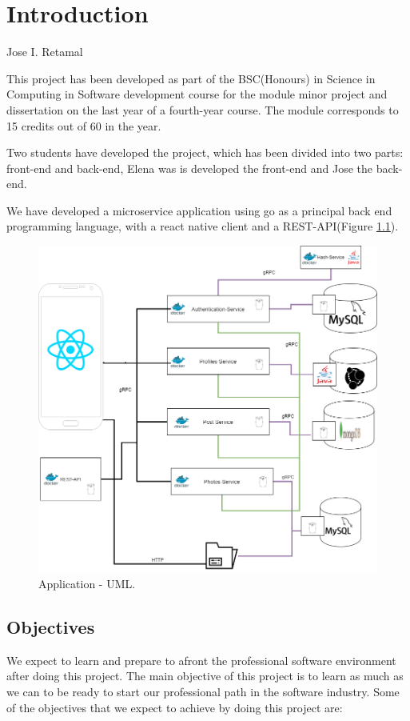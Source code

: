 \chapter{Introduction}
Jose I. Retamal
\vskip 0.1in
\indent
\indent

This project has been developed as part of the BSC(Honours) in Science in Computing in Software development course for the module minor project and dissertation on the last year of a fourth-year course. The module corresponds to 15 credits out of 60 in the year. 

Two students have developed the project, which has been divided into two parts: front-end and back-end, Elena was is developed the front-end and Jose the back-end.

We have developed a microservice application using go as a principal back end programming language, with a react native client and a REST-API(Figure \ref{application:uml}).
\begin{figure}
	\begin{center}
		\includegraphics[width=120mm,scale=1]{img/main-uml.png}
		\caption{Application -  UML.}
		\label{application:uml}
	\end{center}
\end{figure}

\section{Objectives}
\vskip 0.1in
\indent
\indent
We expect to learn and prepare to afront the professional software environment after doing this project. The main objective of this project is to learn as much as we can to be ready to start our professional path in the software industry. Some of the objectives that we expect to achieve by doing this project are:

